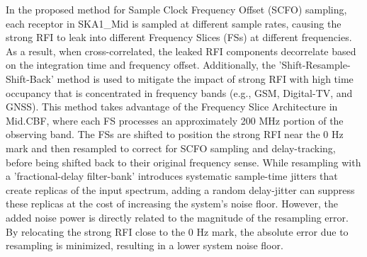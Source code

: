 In the proposed method for Sample Clock Frequency Offset (SCFO) sampling, each receptor in SKA1\_Mid is sampled at different sample rates, causing the strong RFI to leak into different Frequency Slices (FSs) at different frequencies. As a result, when cross-correlated, the leaked RFI components decorrelate based on the integration time and frequency offset. Additionally, the 'Shift-Resample-Shift-Back' method is used to mitigate the impact of strong RFI with high time occupancy that is concentrated in frequency bands (e.g., GSM, Digital-TV, and GNSS). This method takes advantage of the Frequency Slice Architecture in Mid.CBF, where each FS processes an approximately 200 MHz portion of the observing band. The FSs are shifted to position the strong RFI near the 0 Hz mark and then resampled to correct for SCFO sampling and delay-tracking, before being shifted back to their original frequency sense. While resampling with a 'fractional-delay filter-bank' introduces systematic sample-time jitters that create replicas of the input spectrum, adding a random delay-jitter can suppress these replicas at the cost of increasing the system's noise floor. However, the added noise power is directly related to the magnitude of the resampling error. By relocating the strong RFI close to the 0 Hz mark, the absolute error due to resampling is minimized, resulting in a lower system noise floor.